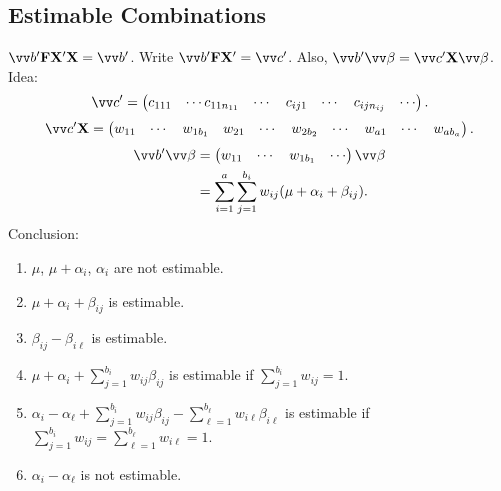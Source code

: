 \subsection*{Estimable Combinations}
$ \Vector{b}'\Matrix{F}\Matrix{X}'\Matrix{X}=\Vector{b}' $.
Write $ \Vector{b}'\Matrix{F}\Matrix{X}'=\Vector{c}' $.
Also, $ \Vector{b}'\Vector{\beta}=\Vector{c}'\Matrix{X}\Vector{\beta} $. Idea:
\[ \Vector{c}'=\begin{pmatrix}
        c_{111} & \cdots c_{11n_{11}} & \cdots & c_{ij1} & \cdots & c_{ijn_{ij}} & \cdots
    \end{pmatrix}. \]
\[ \Vector{c}'\Matrix{X}=\begin{pmatrix}
        w_{11} & \cdots & w_{1b_1} & w_{21} & \cdots & w_{2b_2} & \cdots & w_{a1} & \cdots & w_{ab_a}
    \end{pmatrix}. \]
\begin{align*}
    \Vector{b}'\Vector{\beta}
     & =\begin{pmatrix}
            w_{11} & \cdots & w_{1b_1} & \cdots
        \end{pmatrix}\Vector{\beta}                            \\
     & =\sum_{i=1}^{a}\sum_{j=1}^{b_i}w_{ij}(\mu+\alpha_i+\beta_{ij}).
\end{align*}
Conclusion:
\begin{enumerate}[(1)]
    \item $ \mu $, $ \mu+\alpha_i $, $ \alpha_i $ are not estimable.
    \item $ \mu+\alpha_i+\beta_{ij} $ is estimable.
    \item $ \beta_{ij}-\beta_{i\ell} $ is estimable.
    \item $ \mu+\alpha_i+\sum_{j=1}^{b_i}w_{ij}\beta_{ij} $ is estimable if $ \sum_{j=1}^{b_i}w_{ij}=1 $.
    \item $ \alpha_i-\alpha_\ell+\sum_{j=1}^{b_i}w_{ij}\beta_{ij}-\sum_{\ell=1}^{b_\ell}w_{i\ell}\beta_{i\ell} $
          is estimable if $ \sum_{j=1}^{b_i}w_{ij}=\sum_{\ell=1}^{b_\ell}w_{i\ell}=1 $.
    \item $ \alpha_i-\alpha_\ell $ is not estimable.
\end{enumerate}
